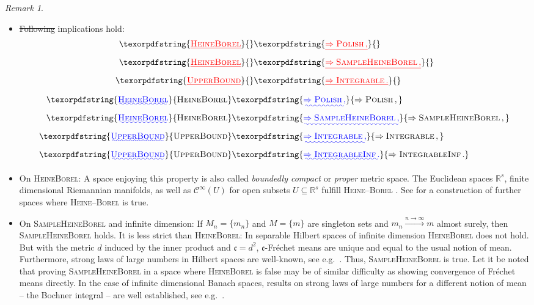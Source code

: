 \documentclass{scrartcl}
\renewcommand{\subset}{\subseteq}
\newcommand*{\mc}[1]{\mathcal{#1}}
\newcommand*{\mf}[1]{\mathfrak{#1}}
\newcommand{\R}{\mathbb{R}}
\newcommand{\equationFullstop}{\, .}
\newcommand{\eqfs}{\equationFullstop}
\newcommand{\equationComma}{\, ,}
\newcommand{\eqcm}{\equationComma}
\theoremstyle{plain}\newtheorem{theorem}{Theorem}[section]
\theoremstyle{definition}
\theoremstyle{remark}
\newtheorem{remark}[theorem]{Remark}
\providecommand{\DIFaddtex}[1]{{\protect\color{blue}\uwave{#1}}} %
\providecommand{\DIFdeltex}[1]{{\protect\color{red}\sout{#1}}}                      %
\providecommand{\DIFaddbegin}{} %
\providecommand{\DIFaddend}{} %
\providecommand{\DIFdelbegin}{} %
\providecommand{\DIFdelend}{} %
\providecommand{\DIFadd}[1]{\texorpdfstring{\DIFaddtex{#1}}{#1}} %
\providecommand{\DIFdel}[1]{\texorpdfstring{\DIFdeltex{#1}}{}} %
\newcommand{\DIFscaledelfig}{0.5}
\newlength{\DIFdelgraphicswidth} %
\newlength{\DIFdelgraphicsheight} %
\newcommand{\DIFaddincludegraphics}[2][]{{\color{blue}\fbox{\DIFOincludegraphics[#1]{#2}}}} %
\newcommand{\DIFdelincludegraphics}[2][]{%
\sbox{\DIFdelgraphicsbox}{\DIFOincludegraphics[#1]{#2}}%
\settoboxwidth{\DIFdelgraphicswidth}{\DIFdelgraphicsbox} %
\settoboxtotalheight{\DIFdelgraphicsheight}{\DIFdelgraphicsbox} %
\scalebox{\DIFscaledelfig}{%
\parbox[b]{\DIFdelgraphicswidth}{\usebox{\DIFdelgraphicsbox}\\[-\baselineskip] \rule{\DIFdelgraphicswidth}{0em}}\llap{\resizebox{\DIFdelgraphicswidth}{\DIFdelgraphicsheight}{%
\setlength{\unitlength}{\DIFdelgraphicswidth}%
\begin{picture}(1,1)%
\thicklines\linethickness{2pt} %
{\color[rgb]{1,0,0}\put(0,0){\framebox(1,1){}}}%
{\color[rgb]{1,0,0}\put(0,0){\line( 1,1){1}}}%
{\color[rgb]{1,0,0}\put(0,1){\line(1,-1){1}}}%
\end{picture}%
}\hspace*{3pt}}} %
} %
\DeclareRobustCommand{\DIFaddbegin}{\DIFOaddbegin \let\includegraphics\DIFaddincludegraphics} %
\DeclareRobustCommand{\DIFaddend}{\DIFOaddend \let\includegraphics\DIFOincludegraphics} %
\DeclareRobustCommand{\DIFdelbegin}{\DIFOdelbegin \let\includegraphics\DIFdelincludegraphics} %
\DeclareRobustCommand{\DIFdelend}{\DIFOaddend \let\includegraphics\DIFOincludegraphics} %
\begin{document}
\begin{remark}\label{rem:on_ass1}\mbox{ }
\begin{itemize}
\item 
	\DIFdelbegin \DIFdel{Following }\DIFdelend \DIFaddbegin \DIFadd{The following }\DIFaddend implications hold:
	\DIFdelbegin \begin{align*}
	\DIFdel{\textsc{HeineBorel} }&\DIFdel{\Rightarrow \textsc{Polish}\eqcm}\\
	\DIFdel{\textsc{HeineBorel} }&\DIFdel{\Rightarrow \textsc{SampleHeineBorel}\eqcm}\\
	\DIFdel{\textsc{UpperBound} }&\DIFdel{\Rightarrow \textsc{Integrable}\eqfs
	}\end{align*}%
\DIFdelend \DIFaddbegin \begin{align*}
	\DIFadd{\textsc{HeineBorel} }&\DIFadd{\Rightarrow \textsc{Polish}\eqcm}\\
	\DIFadd{\textsc{HeineBorel} }&\DIFadd{\Rightarrow \textsc{SampleHeineBorel}\eqcm}\\
	\DIFadd{\textsc{UpperBound} }&\DIFadd{\Rightarrow \textsc{Integrable}\eqcm}\\
	\DIFadd{\textsc{UpperBound} }&\DIFadd{\Rightarrow \textsc{IntegrableInf}\eqfs
	}\end{align*}\DIFaddend 
\item On \textsc{HeineBorel}:
	A space enjoying this property is also called \textit{boundedly compact} or \textit{proper} metric space.
	The Euclidean spaces $\R^s$, finite dimensional Riemannian manifolds, as well as $\mc C^\infty(U)$ for open subsets $U \subset \R^s$  fulfill \textsc{Heine--Borel} \cite[section 8.4.7]{edwards95}.
	See \cite{williamson87} for a construction of further spaces where \textsc{Heine--Borel} is true. 
\item On \textsc{SampleHeineBorel} and infinite dimension:
	If $M_n=\{m_n\}$ and $M=\{m\}$ are singleton sets and $m_n \xrightarrow{n\to\infty} m$ almost surely, then \textsc{SampleHeineBorel} holds. It is less strict than \textsc{HeineBorel}: In separable Hilbert spaces of infinite dimension \textsc{HeineBorel} does not hold. But with the metric $d$ induced by the inner product and $\mf c=d^2$, $\mf c$-Fréchet means are unique and equal to the usual notion of mean. Furthermore, strong laws of large numbers in Hilbert spaces are well-known, see e.g.\ \cite{kawabe86}. Thus, \textsc{SampleHeineBorel} is true. Let it be noted that proving \textsc{SampleHeineBorel} in a space where \textsc{HeineBorel} is false may be of similar difficulty as showing convergence of Fréchet means directly. In the case of infinite dimensional Banach spaces, results on strong laws of large numbers for a different notion of mean -- the Bochner integral -- are well established, see e.g.\ \cite{hoffmann76}.

\end{itemize}
\end{remark}
\end{document}
